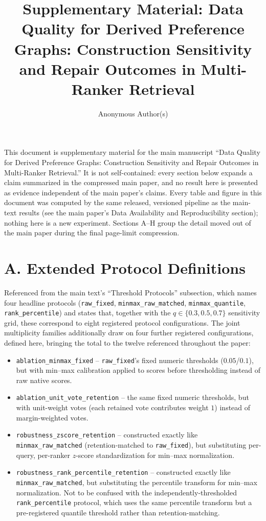 \documentclass[manuscript,anonymous,review]{acmart}
\title{Supplementary Material: Data Quality for Derived Preference Graphs:
  Construction Sensitivity and Repair Outcomes in Multi-Ranker Retrieval}
\author{Anonymous Author(s)}
\affiliation{%
  \institution{Institution redacted for review}
  \country{}
}
\begin{document}
\maketitle

\noindent This document is supplementary material for the main manuscript
``Data Quality for Derived Preference Graphs: Construction Sensitivity and
Repair Outcomes in Multi-Ranker Retrieval.'' It is not self-contained: every
section below expands a claim summarized in the compressed main paper, and no
result here is presented as evidence independent of the main paper's claims.
Every table and figure in this document was computed by the same released,
versioned pipeline as the main-text results (see the main paper's Data
Availability and Reproducibility section); nothing here is a new experiment.
Sections A--H group the detail moved out of the main paper during the final
page-limit compression.

\section{A. Extended Protocol Definitions}
\label{sec:supp-protocols}

Referenced from the main text's ``Threshold Protocols'' subsection,
which names four headline protocols
(\texttt{raw\_fixed}, \texttt{minmax\_raw\_matched}, \texttt{minmax\_quantile},
\texttt{rank\_percentile}) and states that, together with the
$q\in\{0.3,0.5,0.7\}$ sensitivity grid, these correspond to eight registered
protocol configurations. The joint multiplicity families additionally draw
on four further registered configurations, defined here, bringing the total
to the twelve referenced throughout the paper:

\begin{itemize}
  \item \texttt{ablation\_minmax\_fixed} -- \texttt{raw\_fixed}'s fixed
    numeric thresholds ($0.05$/$0.1$), but with min--max calibration applied
    to scores before thresholding instead of raw native scores.
  \item \texttt{ablation\_unit\_vote\_retention} -- the same fixed numeric
    thresholds, but with unit-weight votes (each retained vote contributes
    weight $1$) instead of margin-weighted votes.
  \item \texttt{robustness\_zscore\_retention} -- constructed exactly like
    \texttt{minmax\_raw\_matched} (retention-matched to \texttt{raw\_fixed}),
    but substituting per-query, per-ranker $z$-score standardization for
    min--max normalization.
  \item \texttt{robustness\_rank\_percentile\_retention} -- constructed
    exactly like \texttt{minmax\_raw\_matched}, but substituting the
    percentile transform for min--max normalization. Not to be confused
    with the independently-thresholded \texttt{rank\_percentile} protocol,
    which uses the same percentile transform but a pre-registered quantile
    threshold rather than retention-matching.
\end{itemize}
\end{document}
